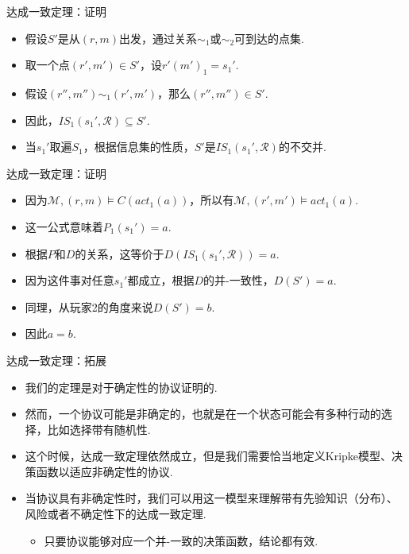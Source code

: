 \begin{frame}{达成一致定理：证明}
\begin{itemize}
    \item 假设$S'$是从$(r,m)$出发，通过关系$\sim_1$或$\sim_2$可到达的点集.
    \item 取一个点$(r',m')\in S'$，设$r'(m')_1=s_1'$.
    \item 假设$(r'',m'')\sim_1(r',m')$，那么$(r'',m'')\in S'$.
    \item 因此，$IS_1(s_1',\mathcal R)\subseteq S'$.
    \item 当$s_1'$取遍$S_1$，根据信息集的性质，$S'$是$IS_1(s_1',\mathcal R)$的不交并.
\end{itemize}
\end{frame}

\begin{frame}{达成一致定理：证明}
\begin{itemize}
    \item 因为$\mathcal M,(r,m)\vDash C(act_1(a))$，所以有$\mathcal M,(r',m')\vDash act_1(a)$.
    \item 这一公式意味着$P_1(s_1')=a$.
    \item 根据$P$和$D$的关系，这等价于$D(IS_1(s_1',\mathcal R))=a$.
    \item 因为这件事对任意$s_1'$都成立，根据$D$的并-一致性，$D(S')=a$.
    \item 同理，从玩家2的角度来说$D(S')=b$.
    \item 因此$a=b$.
\end{itemize}
\end{frame}

\begin{frame}{达成一致定理：拓展}
\begin{itemize}
    \item 我们的定理是对于确定性的协议证明的.
    \item 然而，一个协议可能是非确定的，也就是在一个状态可能会有多种行动的选择，比如选择带有随机性.
    \item 这个时候，达成一致定理依然成立，但是我们需要恰当地定义Kripke模型、决策函数以适应非确定性的协议.
    \item 当协议具有非确定性时，我们可以用这一模型来理解带有先验知识（分布）、风险或者不确定性下的达成一致定理.
    \begin{itemize}
        \item 只要协议能够对应一个并-一致的决策函数，结论都有效.
    \end{itemize}
\end{itemize}
\end{frame}

